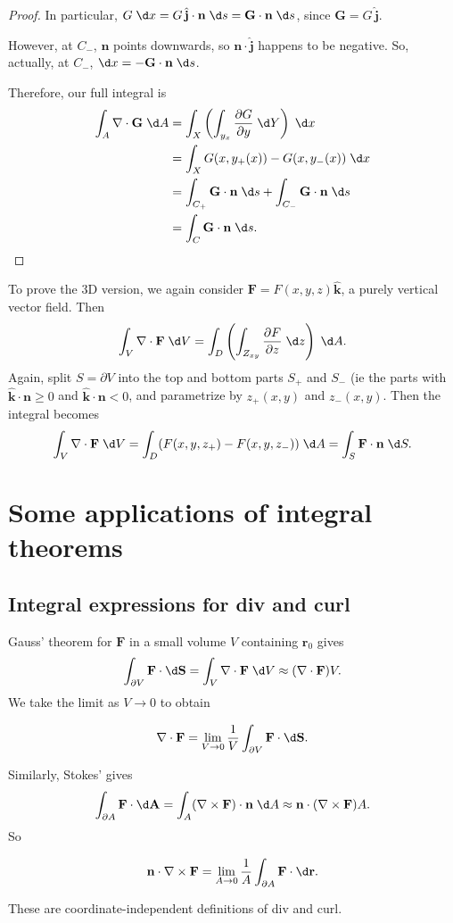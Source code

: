 \documentclass[a4paper]{article}
\begin{document}
\begin{proof}
  In particular, $G\;\d x = G\,\hat{\mathbf{j}}\cdot \mathbf{n}\;\d s = \mathbf{G}\cdot \mathbf{n}\;\d s$, since $\mathbf{G} = G\,\hat{\mathbf{j}}$.

  However, at $C_-$, $\mathbf{n}$ points downwards, so $\mathbf{n}\cdot \hat{\mathbf{j}}$ happens to be negative. So, actually, at $C_-$, $\d x = -\mathbf{G}\cdot \mathbf{n}\;\d s$.

  Therefore, our full integral is
  \begin{align*}
    \int_A \nabla\cdot \mathbf{G}\;\d A &= \int_X \left(\int_{y_x}\frac{\partial G}{\partial y}\;\d Y\right)\;\d x\\
    &= \int_X G(x, y_+(x)) - G(x, y_{-}(x))\;\d x\\
    &= \int_{C_+}\mathbf{G}\cdot \mathbf{n}\;\d s + \int_{C_-}\mathbf{G}\cdot \mathbf{n}\;\d s\\
    &= \int_C \mathbf{G}\cdot \mathbf{n}\;\d s.
  \end{align*}
\end{proof}

To prove the 3D version, we again consider $\mathbf{F} = F(x, y, z)\hat{\mathbf{k}}$, a purely vertical vector field. Then
\[
  \int_V \nabla\cdot \mathbf{F}\;\d V = \int_D \left(\int_{Z_{xy}} \frac{\partial F}{\partial z}\;\d z\right)\;\d A.
\]
Again, split $S = \partial V$ into the top and bottom parts $S_+$ and $S_-$ (ie the parts with $\hat{\mathbf{k}}\cdot \mathbf{n} \geq 0$ and $\hat{\mathbf{k}}\cdot \mathbf{n} < 0$, and parametrize by $z_+(x, y)$ and $z_-(x, y)$. Then the integral becomes
\[
  \int_V \nabla\cdot \mathbf{F}\;\d V = \int_D (F(x, y, z_+) - F(x, y, z_-))\;\d A = \int_S \mathbf{F}\cdot \mathbf{n}\;\d S.
\]
\section{Some applications of integral theorems}
\subsection{Integral expressions for div and curl}
Gauss' theorem for $\mathbf{F}$ in a small volume $V$ containing $\mathbf{r}_0$ gives
\[
  \int_{\partial V}\mathbf{F}\cdot \d \mathbf{S} = \int_V\nabla\cdot \mathbf{F}\;\d V\approx (\nabla\cdot \mathbf{F})V.
\]
We take the limit as $V\to 0$ to obtain
\begin{prop}
  \[
    \nabla \cdot \mathbf{F} = \lim_{V \to 0} \frac{1}{V}\int_{\partial V}\mathbf{F}\cdot \d \mathbf{S}.
  \]
\end{prop}
Similarly, Stokes' gives
\[
  \int _{\partial A}\mathbf{F}\cdot \d \mathbf{A} = \int_A(\nabla\times \mathbf{F})\cdot \mathbf{n}\;\d A \approx \mathbf{n}\cdot (\nabla\times \mathbf{F})A.
\]
So
\begin{prop}
  \[
    \mathbf{n}\cdot \nabla \times \mathbf{F} = \lim_{A \to 0}\frac{1}{A}\int_{\partial A}\mathbf{F}\cdot \d \mathbf{r}.
  \]
\end{prop}
These are coordinate-independent definitions of div and curl.
\end{document}
